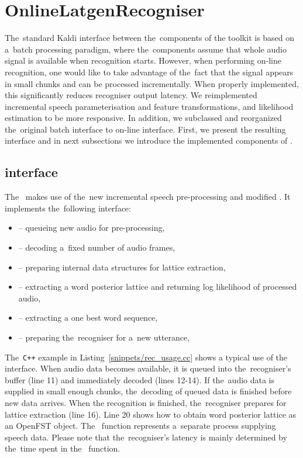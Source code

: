 \section{OnlineLatgenRecogniser}
\label{sec:rec}

The~standard Kaldi interface between the~components of the toolkit is based on a~batch processing paradigm, where the~components assume that whole audio signal is available when recognition starts.
However, when performing on-line recognition, one would like to take advantage of the~fact that the signal appears in small chunks and can be processed incrementally.
When properly implemented, this significantly reduces recogniser output latency.
We reimplemented incremental speech parameterisation and feature transformations, and likelihood estimation to be more responsive.
In addition, we subclassed  and reorganized the~original batch interface to on-line interface.
First, we present the resulting interface and in next subsections we introduce the implemented components of .

\subsection{ interface}
\label{sub:verb_c_}
The~ makes use of the~new incremental speech pre-processing and modified .
It implements the~following interface:
\begin{itemize}
\item {} -- queueing new audio for pre-processing,
\item {} -- decoding a~fixed number of audio frames,
\item {} -- preparing internal data structures for lattice extraction,
\item {} -- extracting a word posterior lattice and returning log likelihood of processed audio,
\item {} -- extracting a one best word sequence,
\item {} -- preparing the~recogniser for a~new utterance,
\end{itemize}

The~\verb!C++! example in Listing~\ref{snippets/rec_usage.cc} shows a typical use of the~ interface.
When audio data becomes available, it is queued into the~recogniser's buffer (line 11) and immediately decoded (lines 12-14).
If the~audio data is supplied in small enough chunks, the~decoding of queued data is finished before new data arrives.
When the recognition is finished, the~recogniser prepares for lattice extraction (line 16).
Line 20 shows how to obtain word posterior lattice as an OpenFST object.
The~ function represents a~separate process supplying speech data.
Please note that the~recogniser's latency is mainly determined by the~time spent in the~ function.

